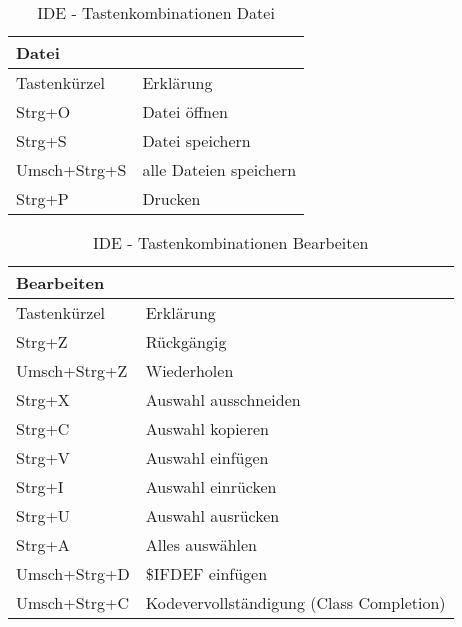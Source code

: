 \begin{table}[htbp]
		\begin{tabular}[ht]{|l|l|}
      \hline
      Datei & \\
      \hline
      Tastenkürzel & Erklärung \\
      \hline
      Strg+O & Datei öffnen\\
      Strg+S & Datei speichern\\
      Umsch+Strg+S & alle Dateien speichern\\
      Strg+P & Drucken\\
      \hline
		\end{tabular}
  \caption{IDE - Tastenkombinationen Datei}
  \label{tab:IDETastenkombDatei} 
\end{table}
\begin{table}[htbp]
		\begin{tabular}[ht]{|l|l|}
      \hline
      Bearbeiten & \\
      \hline
      Tastenkürzel & Erklärung \\
      \hline
      Strg+Z & Rückgängig\\
      Umsch+Strg+Z & Wiederholen\\
      Strg+X & Auswahl ausschneiden\\
      Strg+C & Auswahl kopieren\\
      Strg+V & Auswahl einfügen\\
      Strg+I & Auswahl einrücken\\
      Strg+U & Auswahl ausrücken\\
      Strg+A & Alles auswählen\\
      Umsch+Strg+D & \$IFDEF einfügen\\
      Umsch+Strg+C & Kodevervollständigung (Class Completion) \\
      \hline
		\end{tabular}
  \caption{IDE - Tastenkombinationen Bearbeiten}
  \label{tab:IDETastenkombBearbeiten} 
\end{table}
